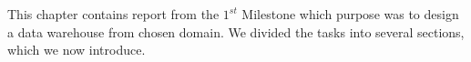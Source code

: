 This chapter contains report from the $1^{st}$  Milestone which purpose was to design a data warehouse from chosen domain. We divided the tasks into several sections, which we now introduce.

